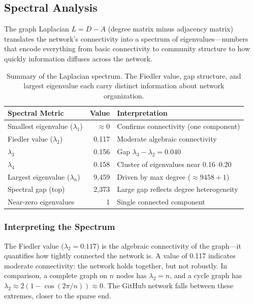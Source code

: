 \documentclass[letterpaper]{article}
\begin{document}
\subsection{Spectral Analysis}

The graph Laplacian $L = D - A$ (degree matrix minus adjacency matrix) translates the network's connectivity into a spectrum of eigenvalues---numbers that encode everything from basic connectivity to community structure to how quickly information diffuses across the network.

\begin{table}[H]
  \centering
  \begin{tabular}{lrl}
    \toprule
    \textbf{Spectral Metric} & \textbf{Value} & \textbf{Interpretation} \\
    \midrule
    Smallest eigenvalue ($\lambda_1$) & $\approx 0$ & Confirms connectivity (one component) \\
    Fiedler value ($\lambda_2$)       & 0.117 & Moderate algebraic connectivity \\
    $\lambda_3$                       & 0.156 & Gap $\lambda_3 - \lambda_2 = 0.040$ \\
    $\lambda_4$                       & 0.158 & Cluster of eigenvalues near 0.16--0.20 \\
    Largest eigenvalue ($\lambda_n$)  & 9,459 & Driven by max degree ($\approx 9458 + 1$) \\
    Spectral gap (top)                & 2,373 & Large gap reflects degree heterogeneity \\
    Near-zero eigenvalues             & 1     & Single connected component \\
    \bottomrule
  \end{tabular}
  \caption{Summary of the Laplacian spectrum. The Fiedler value, gap structure, and largest eigenvalue each carry distinct information about network organization.}
  \label{tab:laplacian}
\end{table}

\subsubsection{Interpreting the Spectrum}

The Fiedler value ($\lambda_2 = 0.117$) is the algebraic connectivity of the graph---it quantifies how tightly connected the network is. A value of 0.117 indicates moderate connectivity: the network holds together, but not robustly. In comparison, a complete graph on $n$ nodes has $\lambda_2 = n$, and a cycle graph has $\lambda_2 \approx 2(1 - \cos(2\pi/n)) \approx 0$. The GitHub network falls between these extremes, closer to the sparse end.
\end{document}
